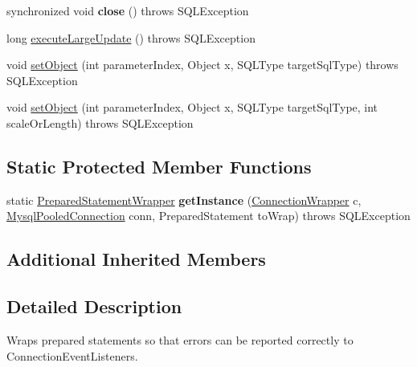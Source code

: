 \begin{DoxyCompactItemize}
\item 
\mbox{\label{classcom_1_1mysql_1_1cj_1_1jdbc_1_1_prepared_statement_wrapper_a4e6ee6803aa0ab8bd8f1b54b1a16042b}} 
synchronized void {\bfseries close} ()  throws S\+Q\+L\+Exception 
\item 
long \mbox{\hyperlink{classcom_1_1mysql_1_1cj_1_1jdbc_1_1_prepared_statement_wrapper_a7a9dc4ef722d9b5288f0a073168d88c1}{execute\+Large\+Update}} ()  throws S\+Q\+L\+Exception 
\item 
void \mbox{\hyperlink{classcom_1_1mysql_1_1cj_1_1jdbc_1_1_prepared_statement_wrapper_a24ea6d1115676790b5c44fbe201b3347}{set\+Object}} (int parameter\+Index, Object x, S\+Q\+L\+Type target\+Sql\+Type)  throws S\+Q\+L\+Exception 
\item 
void \mbox{\hyperlink{classcom_1_1mysql_1_1cj_1_1jdbc_1_1_prepared_statement_wrapper_ae5e27f956733d367f94bf5749114dd51}{set\+Object}} (int parameter\+Index, Object x, S\+Q\+L\+Type target\+Sql\+Type, int scale\+Or\+Length)  throws S\+Q\+L\+Exception 
\end{DoxyCompactItemize}
\subsection*{Static Protected Member Functions}
\begin{DoxyCompactItemize}
\item 
\mbox{\label{classcom_1_1mysql_1_1cj_1_1jdbc_1_1_prepared_statement_wrapper_a3d847e5cf23f25be3a727cb459fbdafd}} 
static \mbox{\hyperlink{classcom_1_1mysql_1_1cj_1_1jdbc_1_1_prepared_statement_wrapper}{Prepared\+Statement\+Wrapper}} {\bfseries get\+Instance} (\mbox{\hyperlink{classcom_1_1mysql_1_1cj_1_1jdbc_1_1_connection_wrapper}{Connection\+Wrapper}} c, \mbox{\hyperlink{classcom_1_1mysql_1_1cj_1_1jdbc_1_1_mysql_pooled_connection}{Mysql\+Pooled\+Connection}} conn, Prepared\+Statement to\+Wrap)  throws S\+Q\+L\+Exception 
\end{DoxyCompactItemize}
\subsection*{Additional Inherited Members}


\subsection{Detailed Description}
Wraps prepared statements so that errors can be reported correctly to Connection\+Event\+Listeners. 

